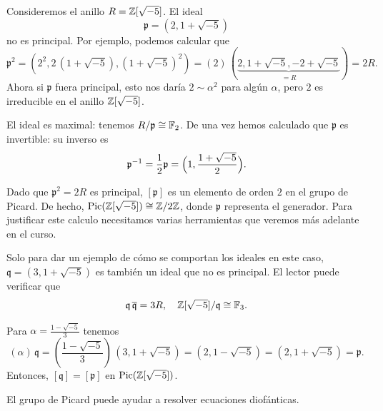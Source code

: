 \begin{ejemplo}
  Consideremos el anillo $R = \mathbb{Z} [\sqrt{-5}]$. El ideal
  $$\mathfrak{p} = (2, 1 + \sqrt{-5})$$
  no es principal. Por ejemplo, podemos calcular que
  \[ \mathfrak{p}^2 = (2^2, 2\,(1 + \sqrt{-5}), (1 + \sqrt{-5})^2)
     = (2) \, (\underbrace{2, 1 + \sqrt{-5}, -2 + \sqrt{-5}}_{= R}) = 2R.\]
  Ahora si $\mathfrak{p}$ fuera principal, esto nos daría $2 \sim \alpha^2$
  para algún $\alpha$, pero $2$ es irreducible en el anillo $\mathbb{Z} [\sqrt{-5}]$.

  El ideal es maximal: tenemos $R/\mathfrak{p} \cong \mathbb{F}_2$.
  De una vez hemos calculado que $\mathfrak{p}$ es invertible: su inverso es
  \[ \mathfrak{p}^{-1} = \frac{1}{2}\mathfrak{p}
     = \Bigl(1, \frac{1 + \sqrt{-5}}{2}\Bigr). \]

  Dado que $\mathfrak{p}^2 = 2R$ es principal, $[\mathfrak{p}]$ es un elemento
  de orden $2$ en el grupo de Picard. De hecho,
  $\operatorname{Pic} (\mathbb{Z} [\sqrt{-5}]) \cong \mathbb{Z}/2\mathbb{Z}$, donde $\mathfrak{p}$ representa el
  generador. Para justificar este calculo necesitamos varias herramientas que
  veremos más adelante en el curso.

  Solo para dar un ejemplo de cómo se comportan los ideales en este caso,
  $\mathfrak{q} = (3, 1 + \sqrt{-5})$ es también un ideal que no es principal.
  El lector puede verificar que
  \[ \mathfrak{q}\,\overline{\mathfrak{q}} = 3R, \quad
     \mathbb{Z} [\sqrt{-5}]/\mathfrak{q} \cong \mathbb{F}_3. \]

  Para $\alpha = \frac{1-\sqrt{-5}}{3}$ tenemos
  \[ (\alpha)\,\mathfrak{q} =
     \left(\frac{1-\sqrt{-5}}{3}\right) \, (3, 1 + \sqrt{-5}) =
     (2, 1-\sqrt{-5}) = (2, 1+\sqrt{-5}) = \mathfrak{p}. \]
  Entonces, $[\mathfrak{q}] = [\mathfrak{p}]$ en $\operatorname{Pic} (\mathbb{Z} [\sqrt{-5}])$.
\end{ejemplo}

El grupo de Picard puede ayudar a resolver ecuaciones diofánticas.

